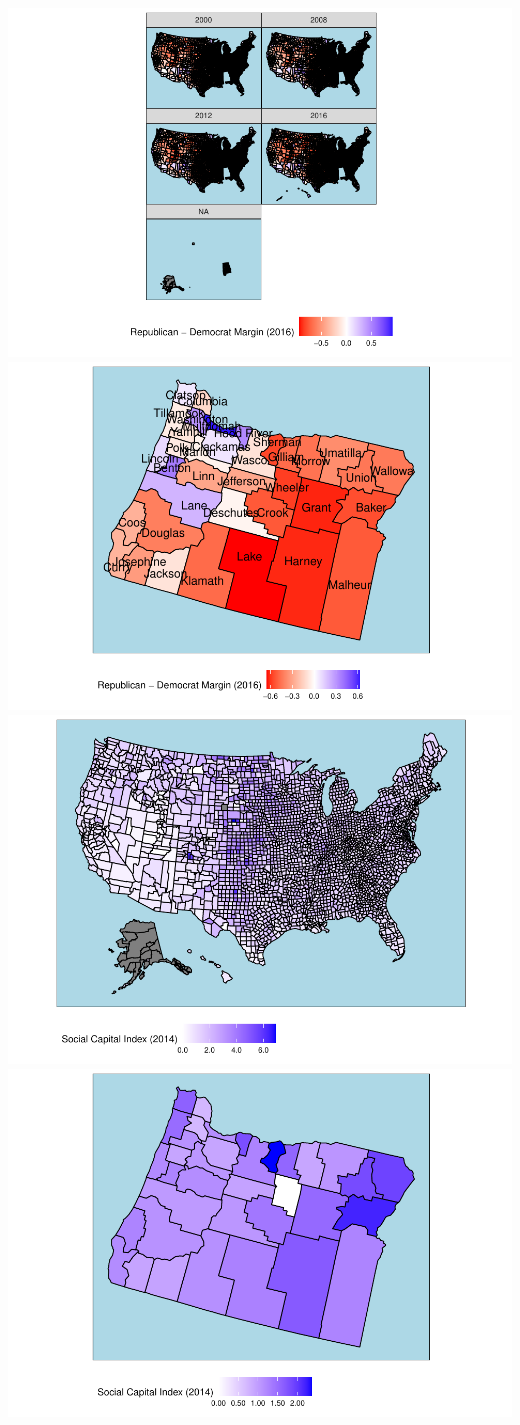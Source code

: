 \documentclass[
  english,
  man]{apa6}
\begin{document}
\includegraphics{Script_files/figure-latex/visualization part 2-3.pdf} \includegraphics{Script_files/figure-latex/visualization part 2-4.pdf} \includegraphics{Script_files/figure-latex/visualization part 2-5.pdf} \includegraphics{Script_files/figure-latex/visualization part 2-6.pdf}
\end{document}

